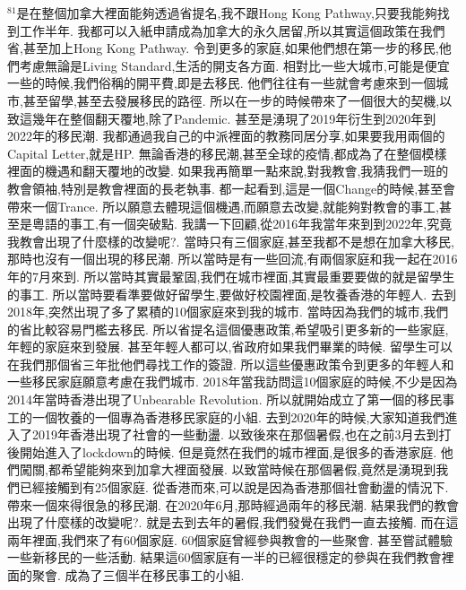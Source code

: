 \documentclass{book}
\begin{document}
$^{81}$是在整個加拿大裡面能夠透過省提名,我不跟Hong Kong Pathway,只要我能夠找到工作半年.
我都可以入紙申請成為加拿大的永久居留,所以其實這個政策在我們省,甚至加上Hong Kong Pathway.
令到更多的家庭,如果他們想在第一步的移民,他們考慮無論是Living Standard,生活的開支各方面.
相對比一些大城市,可能是便宜一些的時候,我們俗稱的開平費,即是去移民.
他們往往有一些就會考慮來到一個城市,甚至留學,甚至去發展移民的路徑.
所以在一步的時候帶來了一個很大的契機,以致這幾年在整個翻天覆地,除了Pandemic.
甚至是湧現了2019年衍生到2020年到2022年的移民潮.
我都通過我自己的中派裡面的教務同居分享,如果要我用兩個的Capital Letter,就是HP.
無論香港的移民潮,甚至全球的疫情,都成為了在整個模樣裡面的機遇和翻天覆地的改變.
如果我再簡單一點來說,對我教會,我猜我們一班的教會領袖,特別是教會裡面的長老執事.
都一起看到,這是一個Change的時候,甚至會帶來一個Trance.
所以願意去體現這個機遇,而願意去改變,就能夠對教會的事工,甚至是粵語的事工,有一個突破點.
我講一下回顧,從2016年我當年來到到2022年,究竟我教會出現了什麼樣的改變呢?.
當時只有三個家庭,甚至我都不是想在加拿大移民,那時也沒有一個出現的移民潮.
所以當時是有一些回流,有兩個家庭和我一起在2016年的7月來到.
所以當時其實最鞏固,我們在城市裡面,其實最重要要做的就是留學生的事工.
所以當時要看準要做好留學生,要做好校園裡面,是牧養香港的年輕人.
去到2018年,突然出現了多了累積的10個家庭來到我的城市.
當時因為我們的城市,我們的省比較容易門檻去移民.
所以省提名這個優惠政策,希望吸引更多新的一些家庭,年輕的家庭來到發展.
甚至年輕人都可以,省政府如果我們畢業的時候.
留學生可以在我們那個省三年批他們尋找工作的簽證.
所以這些優惠政策令到更多的年輕人和一些移民家庭願意考慮在我們城市.
2018年當我訪問這10個家庭的時候,不少是因為2014年當時香港出現了Unbearable Revolution.
所以就開始成立了第一個的移民事工的一個牧養的一個專為香港移民家庭的小組.
去到2020年的時候,大家知道我們進入了2019年香港出現了社會的一些動盪.
以致後來在那個暑假,也在之前3月去到打後開始進入了lockdown的時候.
但是竟然在我們的城市裡面,是很多的香港家庭.
他們闖關,都希望能夠來到加拿大裡面發展.
以致當時候在那個暑假,竟然是湧現到我們已經接觸到有25個家庭.
從香港而來,可以說是因為香港那個社會動盪的情況下.
帶來一個來得很急的移民潮.
在2020年6月,那時經過兩年的移民潮.
結果我們的教會出現了什麼樣的改變呢?.
就是去到去年的暑假,我們發覺在我們一直去接觸.
而在這兩年裡面,我們來了有60個家庭.
60個家庭曾經參與教會的一些聚會.
甚至嘗試體驗一些新移民的一些活動.
結果這60個家庭有一半的已經很穩定的參與在我們教會裡面的聚會.
成為了三個半在移民事工的小組.
\end{document}

